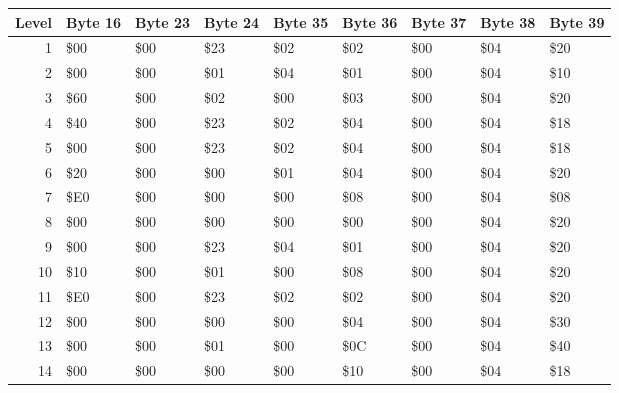 \begin{figure}[H]
  {
  \setlength{\tabcolsep}{3.0pt}
  \setlength\cmidrulewidth{\heavyrulewidth} %
  \begin{adjustbox}{width=\textwidth}

\begin{tabular}{rllllllll}
\toprule
   Level & Byte 16   & Byte 23   & Byte 24   & Byte 35   & Byte 36   & Byte 37   & Byte 38   & Byte 39   \\
\midrule
       1 & \$00       & \$00       & \$23       & \$02       & \$02       & \$00       & \$04       & \$20       \\
       2 & \$00       & \$00       & \$01       & \$04       & \$01       & \$00       & \$04       & \$10       \\
       3 & \$60       & \$00       & \$02       & \$00       & \$03       & \$00       & \$04       & \$20       \\
       4 & \$40       & \$00       & \$23       & \$02       & \$04       & \$00       & \$04       & \$18       \\
       5 & \$00       & \$00       & \$23       & \$02       & \$04       & \$00       & \$04       & \$18       \\
       6 & \$20       & \$00       & \$00       & \$01       & \$04       & \$00       & \$04       & \$20       \\
       7 & \$E0       & \$00       & \$00       & \$00       & \$08       & \$00       & \$04       & \$08       \\
       8 & \$00       & \$00       & \$00       & \$00       & \$00       & \$00       & \$04       & \$20       \\
       9 & \$00       & \$00       & \$23       & \$04       & \$01       & \$00       & \$04       & \$20       \\
      10 & \$10       & \$00       & \$01       & \$00       & \$08       & \$00       & \$04       & \$20       \\
      11 & \$E0       & \$00       & \$23       & \$02       & \$02       & \$00       & \$04       & \$20       \\
      12 & \$00       & \$00       & \$00       & \$00       & \$04       & \$00       & \$04       & \$30       \\
      13 & \$00       & \$00       & \$01       & \$00       & \$0C       & \$00       & \$04       & \$40       \\
      14 & \$00       & \$00       & \$00       & \$00       & \$10       & \$00       & \$04       & \$18       \\

\end{tabular}
\end{adjustbox}}
\end{figure}

